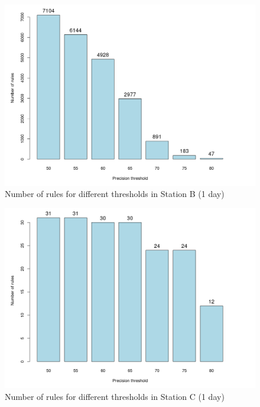 \begin{figure}[hbtp]
\includegraphics[width=\textwidth]{img/precision_ant1.png}
\caption{Number of rules for different thresholds in Station B (1 day)} \label{fig:precision_ant1}
\end{figure}

\begin{figure}[hbtp]
\includegraphics[width=\textwidth]{img/precision_seg1.png}
\caption{Number of rules for different thresholds in Station C (1 day)} \label{fig:precision_seg1}
\end{figure}

